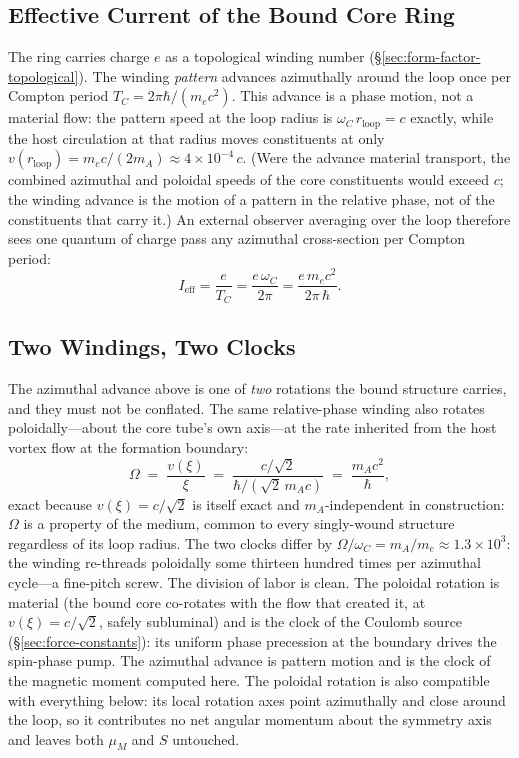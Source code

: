 \subsection{Effective Current of the Bound Core Ring}

The ring carries charge $e$ as a topological winding number
(§\ref{sec:form-factor-topological}). The winding \emph{pattern}
advances azimuthally around the loop once per Compton period
$T_C = 2\pi\hbar/(m_e c^2)$. This advance is a phase motion, not a
material flow: the pattern speed at the loop radius is
$\omega_C\,r_{\text{loop}} = c$ exactly, while the host circulation at
that radius moves constituents at only
$v(r_{\text{loop}}) = m_e c/(2 m_A) \approx 4\times10^{-4}\,c$. (Were
the advance material transport, the combined azimuthal and poloidal
speeds of the core constituents would exceed $c$; the winding advance
is the motion of a pattern in the relative phase, not of the
constituents that carry it.) An external observer averaging over the
loop therefore sees one quantum of charge pass any azimuthal
cross-section per Compton period:
\begin{equation}
I_{\text{eff}} = \frac{e}{T_C}
              = \frac{e\,\omega_C}{2\pi}
              = \frac{e\,m_e c^2}{2\pi\,\hbar}.
\label{eq:I-eff-bohr}
\end{equation}

\subsection{Two Windings, Two Clocks}
\label{sec:two-clocks}

The azimuthal advance above is one of \emph{two} rotations the bound
structure carries, and they must not be conflated. The same
relative-phase winding also rotates poloidally---about the core tube's
own axis---at the rate inherited from the host vortex flow at the
formation boundary:
\begin{equation}
\Omega \;=\; \frac{v(\xi)}{\xi}
        \;=\; \frac{c/\sqrt{2}}{\hbar/(\sqrt{2}\,m_A c)}
        \;=\; \frac{m_A c^2}{\hbar},
\label{eq:poloidal-clock}
\end{equation}
exact because $v(\xi) = c/\sqrt{2}$ is itself exact and
$m_A$-independent in construction: $\Omega$ is a property of the
medium, common to every singly-wound structure regardless of its loop
radius. The two clocks differ by
$\Omega/\omega_C = m_A/m_e \approx 1.3\times10^{3}$: the winding
re-threads poloidally some thirteen hundred times per azimuthal
cycle---a fine-pitch screw. The division of labor is clean. The
poloidal rotation is material (the bound core co-rotates with the flow
that created it, at $v(\xi) = c/\sqrt{2}$, safely subluminal) and is
the clock of the Coulomb source (§\ref{sec:force-constants}): its
uniform phase precession at the boundary drives the spin-phase pump.
The azimuthal advance is pattern motion and is the clock of the
magnetic moment computed here. The poloidal rotation is also
compatible with everything below: its local rotation axes point
azimuthally and close around the loop, so it contributes no net
angular momentum about the symmetry axis and leaves both $\mu_M$ and
$S$ untouched.


